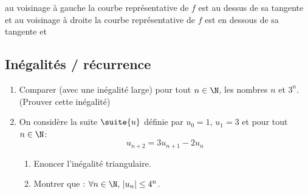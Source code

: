 \begin{correction}
\begin{enumerate}
au voisinage à gauche la courbe représentative de $f$ est au dessus de sa tangente et au voisinage à droite la courbe représentative de $f$ est en dessous de sa tangente et 
\end{enumerate}

\end{correction}








\subsection{Inégalités / récurrence}
\begin{exercice}
\begin{enumerate}
\item Comparer (avec une inégalité large) pour tout $n\in \N$, les nombres $n$ et $ 3^n$. (Prouver cette inégalité) 
\item On considère la suite $\suite{u}$ définie par $u_0=1$, $u_1= 3$  et pour tout $n\in \N$:
$$u_{n+2} =3u_{n+1} -2u_n$$
\begin{enumerate}
\item Enoncer l'inégalité triangulaire.
\item Montrer que  : $\forall n\in \N,\, |u_n| \leq 4^n$. 
\end{enumerate}
\end{enumerate}
\end{exercice}


